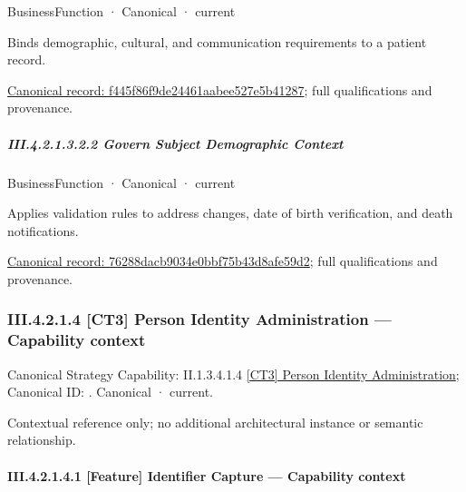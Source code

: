 \label{element:f445f86f9de24461aabee527e5b41287}
{\small BusinessFunction · Canonical · current}\par

Binds demographic, cultural, and communication requirements to a patient record.


{\footnotesize \href{../../../../../../../continuum/business/business-function/f445f86f9de24461aabee527e5b41287.md}{Canonical record: f445f86f9de24461aabee527e5b41287}; full qualifications and provenance.}\par
\subparagraph*{III.4.2.1.3.2.2 Govern Subject Demographic Context}
\label{navigation:III.4.2.1.3.2.2}

\label{element:76288dacb9034e0bbf75b43d8afe59d2}
{\small BusinessFunction · Canonical · current}\par

Applies validation rules to address changes, date of birth verification, and death notifications.


{\footnotesize \href{../../../../../../../continuum/business/business-function/76288dacb9034e0bbf75b43d8afe59d2.md}{Canonical record: 76288dacb9034e0bbf75b43d8afe59d2}; full qualifications and provenance.}\par
\subsubsection*{III.4.2.1.4 [CT3] Person Identity Administration — Capability context}
\label{navigation:III.4.2.1.4}

{\small Canonical Strategy Capability: II.1.3.4.1.4 \hyperref[element:6c3de7750ef1436cad6a9533731782b6]{[CT3] Person Identity Administration}; Canonical ID: \texttt{}. Canonical · current.}\par
Contextual reference only; no additional architectural instance or semantic relationship.\par
\paragraph*{III.4.2.1.4.1 [Feature] Identifier Capture — Capability context}
\label{navigation:III.4.2.1.4.1}

